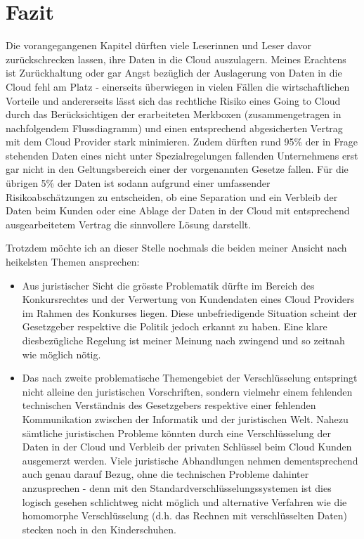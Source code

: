 \documentclass[a4paper,pointlessnumbers]{scrreprt}
\begin{document}
\chapter{Fazit}
Die vorangegangenen Kapitel dürften viele Leserinnen und Leser davor zurückschrecken lassen, ihre Daten in die Cloud auszulagern. Meines Erachtens ist Zurückhaltung oder gar Angst bezüglich der Auslagerung von Daten in die Cloud fehl am Platz - einerseits überwiegen in vielen Fällen die wirtschaftlichen Vorteile und andererseits lässt sich das rechtliche Risiko eines Going to Cloud durch das Berücksichtigen der erarbeiteten Merkboxen (zusammengetragen in nachfolgendem Flussdiagramm) und einen entsprechend abgesicherten Vertrag mit dem Cloud Provider stark minimieren. Zudem dürften rund 95\% der in Frage stehenden Daten eines nicht unter Spezialregelungen fallenden Unternehmens erst gar nicht in den Geltungsbereich einer der vorgenannten Gesetze fallen. Für die übrigen 5\% der Daten ist sodann aufgrund einer umfassender Risikoabschätzungen zu entscheiden, ob eine Separation und ein Verbleib der Daten beim Kunden oder eine Ablage der Daten in der Cloud mit entsprechend ausgearbeitetem Vertrag die sinnvollere Lösung darstellt.

Trotzdem möchte ich an dieser Stelle nochmals die beiden meiner Ansicht nach heikelsten Themen ansprechen:
\begin{itemize}[itemsep=0pt]
\item Aus juristischer Sicht die grösste Problematik dürfte im Bereich des Konkursrechtes und der Verwertung von Kundendaten eines Cloud Providers im Rahmen des Konkurses liegen. Diese unbefriedigende Situation scheint der Gesetzgeber respektive die Politik jedoch erkannt zu haben. Eine klare diesbezügliche Regelung ist meiner Meinung nach zwingend und so zeitnah wie möglich nötig.
\item Das nach zweite problematische Themengebiet der Verschlüsselung entspringt nicht alleine den juristischen Vorschriften, sondern vielmehr einem fehlenden technischen Verständnis des Gesetzgebers respektive einer fehlenden Kommunikation zwischen der Informatik und der juristischen Welt. Nahezu sämtliche juristischen Probleme könnten durch eine Verschlüsselung der Daten in der Cloud und Verbleib der privaten Schlüssel beim Cloud Kunden ausgemerzt werden. Viele juristische Abhandlungen nehmen dementsprechend auch genau darauf Bezug, ohne die technischen Probleme dahinter anzusprechen - denn mit den Standardverschlüsselungssystemen ist dies logisch gesehen schlichtweg nicht möglich und alternative Verfahren wie die homomorphe Verschlüsselung (d.h. das Rechnen mit verschlüsselten Daten) stecken noch in den Kinderschuhen.
\end{itemize}
\end{document}
